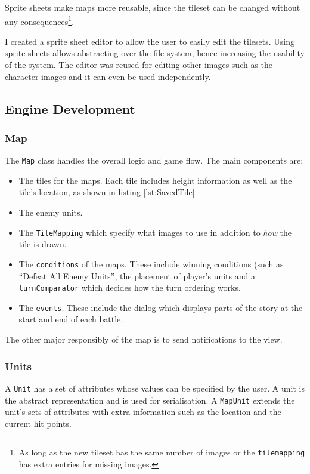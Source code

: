 Sprite sheets make maps more reusable, since the tileset can be changed without any consequences\footnote{As long as the new tileset has the same number of images or the \texttt{tilemapping} has extra entries for missing images.}.  

I created a sprite sheet editor to allow the user to easily edit the tilesets. Using sprite sheets allows abstracting over the file system, hence increasing the usability of the system. The editor was reused for editing other images such as the character images and it can even be used independently.

\clearpage
\subsection{Engine Development}
\label{sub:engine_development_and_testing}
\subsubsection{Map}
\label{ssub:maps}


The \texttt{Map} class handles the overall logic and game flow.   The main components are:
\begin{itemize}
\item The tiles for the maps. Each tile includes height information as well as the tile's location, as shown in listing \ref{lst:SavedTile}.

\item The enemy units.     

\item The \texttt{TileMapping} which specify what images to use in addition to \emph{how} the tile is drawn. 

\item  The \texttt{conditions} of the maps. These include winning conditions (such as ``Defeat All Enemy Units'',  the placement of player's units and a \texttt{turnComparator} which decides how the turn ordering works.  

\item  The \texttt{events}. These include the dialog which displays parts of the story at the start and end of each battle. 
\end{itemize}

The other major responsibly of the map is to send notifications to the view.  

\subsubsection{Units}
\label{ssub:units}
A \texttt{Unit} has a set of attributes whose values can be specified by the user. A unit is the abstract representation and is used for serialisation.  A \texttt{MapUnit} extends the unit's sets of attributes with extra information such as the location and the current hit points.

